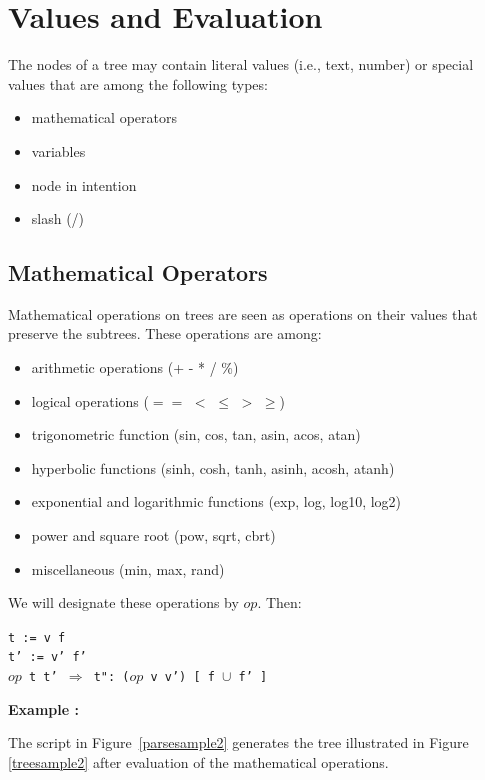 \documentclass{article}
\newcommand{\exemple}	{\vspace*{1mm}\hspace*{-4mm}\textbf{Example :}}
\newcommand{\op}	[1]		{\vspace{0mm}\begin{center}\colorbox{mygrey}{
							\begin{minipage}[t]{0.9\columnwidth} 
							{\small \texttt{#1}}
							\end{minipage}}\end{center}}
\newcommand{\binop}		{$op$}
\begin{document}
\section{Values and Evaluation}\label{sec:valeurs}

The nodes of a tree may contain literal values (i.e., text, number) or special values that are among the following types:
\begin{itemize}
 \setlength\itemsep{0.0em}
\item mathematical operators
\item variables
\item node in intention
\item slash (/)
\end{itemize}



\subsection{Mathematical Operators}

Mathematical operations on trees are seen as operations on their values that preserve the subtrees. These operations are among:
\begin{itemize}
 \setlength\itemsep{0.0em}
\item arithmetic operations (+ - * / \%)
\item logical operations ($==$ $<$ $\leq$ $>$ $\geq$)
\item trigonometric function (sin, cos, tan, asin, acos, atan)
\item hyperbolic functions (sinh, cosh, tanh, asinh, acosh, atanh)
\item exponential and logarithmic functions (exp, log, log10, log2)
\item power and square root (pow, sqrt, cbrt)
\item miscellaneous  (min, max, rand)
\end{itemize}

We will designate these operations by \binop. Then:
\op{t :=  v f\\
t' := v' f'\\
\binop\ t t'  $\Rightarrow$  t":  (\binop\ v v') [ f $\cup$ f' ]  
}

\exemple

The script in Figure~\ref{parsesample2} generates the tree illustrated in Figure \ref{treesample2} after evaluation of the mathematical operations.
\end{document}
